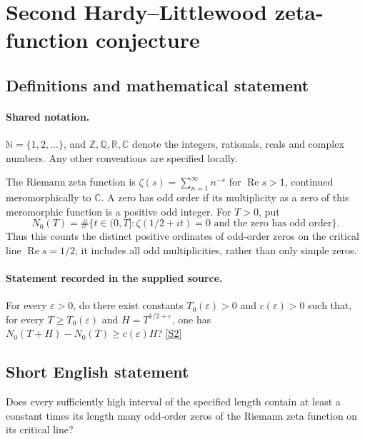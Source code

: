 \documentclass[11pt]{article}
\newcommand{\sref}[2]{\hyperlink{source:#1:#2}{[S#2]}}
\begin{document}
\section{Second Hardy–Littlewood zeta-function conjecture}\label{statement}

\subsection{Definitions and mathematical statement}

\paragraph{Shared notation.}$\mathbb N=\{1,2,\ldots\}$, and $\mathbb Z,\mathbb Q,\mathbb R,\mathbb C$ denote the integers, rationals, reals and complex numbers. Any other conventions are specified locally.


The Riemann zeta function is $\zeta(s)=\sum_{n=1}^{\infty}n^{-s}$ for $\operatorname{Re}s>1$, continued meromorphically to $\mathbb C$. A zero has odd order if its multiplicity as a zero of this meromorphic function is a positive odd integer. For $T>0$, put
\[N_0(T)=\#\{t\in(0,T]:\zeta(1/2+it)=0\text{ and the zero has odd order}\}.\]
Thus this counts the distinct positive ordinates of odd-order zeros on the critical line $\operatorname{Re}s=1/2$; it includes all odd multiplicities, rather than only simple zeros.
\paragraph{Statement recorded in the supplied source.}
For every $\varepsilon>0$, do there exist constants $T_0(\varepsilon)>0$ and $c(\varepsilon)>0$ such that, for every $T\ge T_0(\varepsilon)$ and $H=T^{1/2+\varepsilon}$, one has $N_0(T+H)-N_0(T)\ge c(\varepsilon)H$? \sref{statement}{2}
\subsection{Short English statement}
Does every sufficiently high interval of the specified length contain at least a constant times its length many odd-order zeros of the Riemann zeta function on its critical line?
\end{document}
